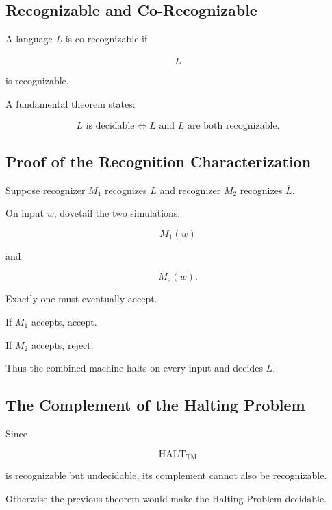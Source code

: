 \subsection{Recognizable and Co-Recognizable}
\label{subsec:co-recognizable}

A language \(L\) is co-recognizable if

\[
\boxed{
\overline{L}
}
\]

is recognizable.

A fundamental theorem states:

\[
\boxed{
L
\text{ is decidable}
\iff
L
\text{ and }\overline{L}
\text{ are both recognizable}.
}
\]

\subsection{Proof of the Recognition Characterization}
\label{subsec:recognizable-complement-proof}

Suppose recognizer \(M_1\) recognizes \(L\) and recognizer \(M_2\) recognizes
\(\overline{L}\).

On input \(w\), dovetail the two simulations:

\[
\boxed{
M_1(w)
}
\]

and

\[
\boxed{
M_2(w).
}
\]

Exactly one must eventually accept.

If \(M_1\) accepts, accept.

If \(M_2\) accepts, reject.

Thus the combined machine halts on every input and decides \(L\).

\subsection{The Complement of the Halting Problem}
\label{subsec:complement-halting}

Since

\[
\operatorname{HALT}_{\mathrm{TM}}
\]

is recognizable but undecidable, its complement cannot also be
recognizable.

Otherwise the previous theorem would make the Halting Problem decidable.

